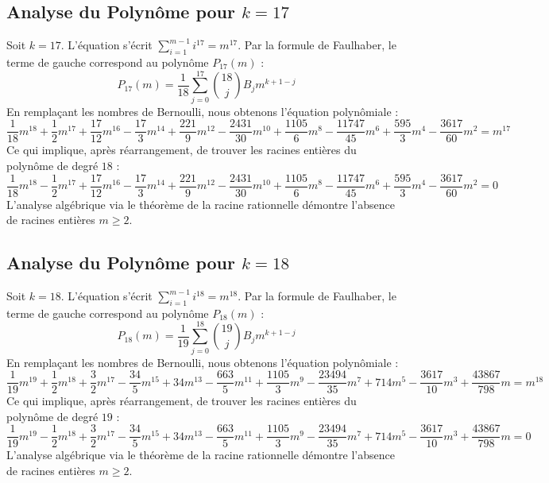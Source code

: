 \documentclass[11pt,a4paper]{article}
\begin{document}
\subsection{Analyse du Polynôme pour $k = 17$}
Soit $k = 17$. L'équation s'écrit $\sum_{i=1}^{m-1} i^{17} = m^{17}$.
Par la formule de Faulhaber, le terme de gauche correspond au polynôme $P_{17}(m)$ :
$$ P_{17}(m) = \frac{1}{18} \sum_{j=0}^{17} \binom{18}{j} B_j m^{k+1-j} $$
En remplaçant les nombres de Bernoulli, nous obtenons l'équation polynômiale :
$$ \frac{1}{18} m^18+\frac{1}{2} m^17+\frac{17}{12} m^16-\frac{17}{3} m^14+\frac{221}{9} m^12-\frac{2431}{30} m^10+\frac{1105}{6} m^8-\frac{11747}{45} m^6+\frac{595}{3} m^4-\frac{3617}{60} m^2 = m^{17} $$
Ce qui implique, après réarrangement, de trouver les racines entières du polynôme de degré $18$ :
$$ \frac{1}{18} m^18-\frac{1}{2} m^17+\frac{17}{12} m^16-\frac{17}{3} m^14+\frac{221}{9} m^12-\frac{2431}{30} m^10+\frac{1105}{6} m^8-\frac{11747}{45} m^6+\frac{595}{3} m^4-\frac{3617}{60} m^2 = 0 $$
L'analyse algébrique via le théorème de la racine rationnelle démontre l'absence de racines entières $m \geq 2$.

\subsection{Analyse du Polynôme pour $k = 18$}
Soit $k = 18$. L'équation s'écrit $\sum_{i=1}^{m-1} i^{18} = m^{18}$.
Par la formule de Faulhaber, le terme de gauche correspond au polynôme $P_{18}(m)$ :
$$ P_{18}(m) = \frac{1}{19} \sum_{j=0}^{18} \binom{19}{j} B_j m^{k+1-j} $$
En remplaçant les nombres de Bernoulli, nous obtenons l'équation polynômiale :
$$ \frac{1}{19} m^19+\frac{1}{2} m^18+\frac{3}{2} m^17-\frac{34}{5} m^15+34 m^13-\frac{663}{5} m^11+\frac{1105}{3} m^9-\frac{23494}{35} m^7+714 m^5-\frac{3617}{10} m^3+\frac{43867}{798} m = m^{18} $$
Ce qui implique, après réarrangement, de trouver les racines entières du polynôme de degré $19$ :
$$ \frac{1}{19} m^19-\frac{1}{2} m^18+\frac{3}{2} m^17-\frac{34}{5} m^15+34 m^13-\frac{663}{5} m^11+\frac{1105}{3} m^9-\frac{23494}{35} m^7+714 m^5-\frac{3617}{10} m^3+\frac{43867}{798} m = 0 $$
L'analyse algébrique via le théorème de la racine rationnelle démontre l'absence de racines entières $m \geq 2$.
\end{document}
